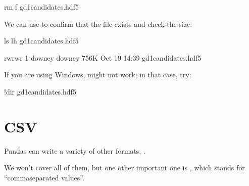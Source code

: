 \documentclass[letterpaper,10pt,english]{sphinxmanual}
\begin{document}
\begin{sphinxVerbatim}[commandchars=\\\{\}]
rm \PYGZhy{}f gd1\PYGZus{}candidates.hdf5
\end{sphinxVerbatim}

\begin{sphinxVerbatim}[commandchars=\\\{\}]
  

 
\end{sphinxVerbatim}

We can use  to confirm that the file exists and check the size:

\begin{sphinxVerbatim}[commandchars=\\\{\}]
ls \PYGZhy{}lh gd1\PYGZus{}candidates.hdf5
\end{sphinxVerbatim}

\begin{sphinxVerbatim}[commandchars=\\\{\}]
\PYGZhy{}rw\PYGZhy{}rw\PYGZhy{}r\PYGZhy{}\PYGZhy{} 1 downey downey 756K Oct 19 14:39 gd1\PYGZus{}candidates.hdf5
\end{sphinxVerbatim}

If you are using Windows,  might not work; in that case, try:

\begin{sphinxVerbatim}[commandchars=\\\{\}]
!dir gd1\PYGZus{}candidates.hdf5
\end{sphinxVerbatim}


\section{CSV}
\label{\detokenize{04_select:csv}}
Pandas can write a variety of other formats, .

We won’t cover all of them, but one other important one is , which stands for “comma\sphinxhyphen{}separated values”.
\end{document}
